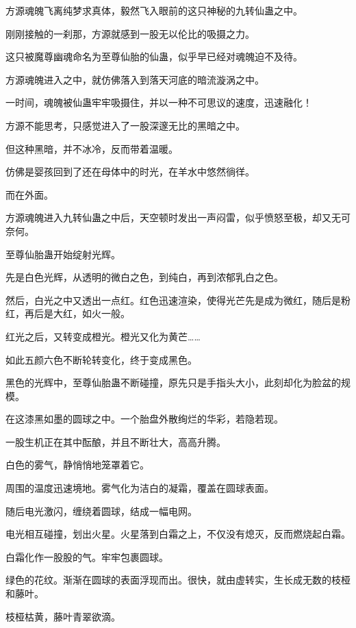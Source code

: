 
\begin{this_body}

方源魂魄飞离纯梦求真体，毅然飞入眼前的这只神秘的九转仙蛊之中。

刚刚接触的一刹那，方源就感到一股无以伦比的吸摄之力。

这只被魔尊幽魂命名为至尊仙胎的仙蛊，似乎早已经对魂魄迫不及待。

方源魂魄进入之中，就仿佛落入到落天河底的暗流漩涡之中。

一时间，魂魄被仙蛊牢牢吸摄住，并以一种不可思议的速度，迅速融化！

方源不能思考，只感觉进入了一股深邃无比的黑暗之中。

但这种黑暗，并不冰冷，反而带着温暖。

仿佛是婴孩回到了还在母体中的时光，在羊水中悠然徜徉。

而在外面。

方源魂魄进入九转仙蛊之中后，天空顿时发出一声闷雷，似乎愤怒至极，却又无可奈何。

至尊仙胎蛊开始绽射光辉。

先是白色光辉，从透明的微白之色，到纯白，再到浓郁乳白之色。

然后，白光之中又透出一点红。红色迅速渲染，使得光芒先是成为微红，随后是粉红，再后是大红，如火一般。

红光之后，又转变成橙光。橙光又化为黄芒……

如此五颜六色不断轮转变化，终于变成黑色。

黑色的光辉中，至尊仙胎蛊不断碰撞，原先只是手指头大小，此刻却化为脸盆的规模。

在这漆黑如墨的圆球之中。一个胎盘外散绚烂的华彩，若隐若现。

一股生机正在其中酝酿，并且不断壮大，高高升腾。

白色的雾气，静悄悄地笼罩着它。

周围的温度迅速境地。雾气化为洁白的凝霜，覆盖在圆球表面。

随后电光激闪，缠绕着圆球，结成一幅电网。

电光相互碰撞，划出火星。火星落到白霜之上，不仅没有熄灭，反而燃烧起白霜。

白霜化作一股股的气。牢牢包裹圆球。

绿色的花纹。渐渐在圆球的表面浮现而出。很快，就由虚转实，生长成无数的枝桠和藤叶。

枝桠枯黄，藤叶青翠欲滴。


\end{this_body}
